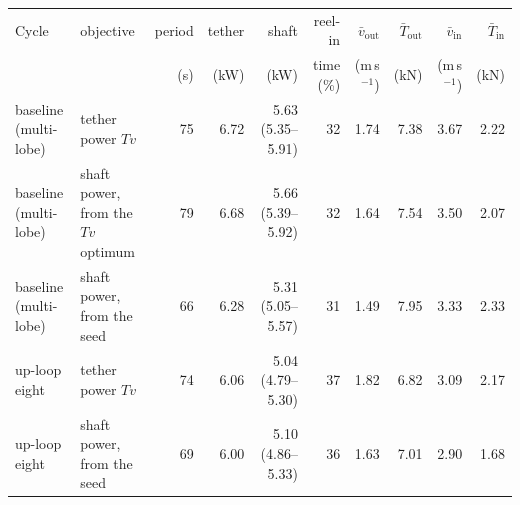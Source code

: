 \begin{tabular}{llrrrrrrrr}
\toprule
Cycle & objective & period & tether & shaft & reel-in & $\bar v_\mathrm{out}$ & $\bar T_\mathrm{out}$ & $\bar v_\mathrm{in}$ & $\bar T_\mathrm{in}$ \\
 & & (s) & (kW) & (kW) & time (\%) & (m\,s$^{-1}$) & (kN) & (m\,s$^{-1}$) & (kN) \\
\midrule
baseline (multi-lobe) & tether power $Tv$ & 75 & 6.72 & 5.63 (5.35--5.91) & 32 & 1.74 & 7.38 & 3.67 & 2.22 \\
baseline (multi-lobe) & shaft power, from the $Tv$ optimum & 79 & 6.68 & 5.66 (5.39--5.92) & 32 & 1.64 & 7.54 & 3.50 & 2.07 \\
baseline (multi-lobe) & shaft power, from the seed & 66 & 6.28 & 5.31 (5.05--5.57) & 31 & 1.49 & 7.95 & 3.33 & 2.33 \\
up-loop eight & tether power $Tv$ & 74 & 6.06 & 5.04 (4.79--5.30) & 37 & 1.82 & 6.82 & 3.09 & 2.17 \\
up-loop eight & shaft power, from the seed & 69 & 6.00 & 5.10 (4.86--5.33) & 36 & 1.63 & 7.01 & 2.90 & 1.68 \\
\bottomrule
\end{tabular}
